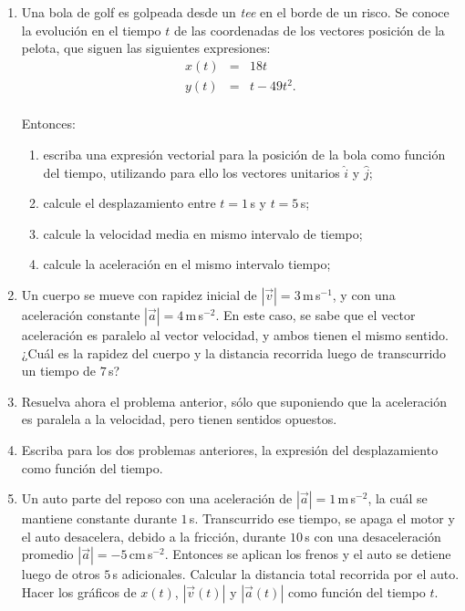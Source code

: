 \documentclass[a4paper,12pt]{article}
\begin{document}
\begin{enumerate}
\item Una bola de golf es golpeada desde un \textit{tee} en el borde de un risco. Se conoce la evolución en el tiempo $t$ de las coordenadas de los vectores posición de la pelota, que siguen las siguientes expresiones:
  \begin{eqnarray}
    x(t) &=& 18t \nonumber \\
    y(t) &=& t - 49t^{2}. \nonumber\\
  \end{eqnarray}

Entonces:

  \begin{enumerate}
    \item escriba una expresión vectorial para la posición de la bola como función del tiempo, utilizando para ello los vectores unitarios $\hat{i}$ y $\hat{j}$;
    \item calcule el desplazamiento entre $t=1$\,s y $t=5$\,s;
    \item calcule la velocidad media en mismo intervalo de tiempo; 
    \item calcule la aceleración en el mismo intervalo tiempo;
  \end{enumerate}

\item Un cuerpo se mueve con rapidez inicial de $|\vec v|=3$\,m\,s$^{-1}$, y con una aceleración constante $|\vec a|=4$\,m\,s$^{-2}$. En este caso, se sabe que el vector aceleración es paralelo al vector velocidad, y ambos tienen el mismo sentido. ¿Cuál es la rapidez del cuerpo y la distancia recorrida luego de transcurrido un tiempo de $7$\,s? 
\item Resuelva ahora el problema anterior, sólo que suponiendo que la aceleración es paralela a la velocidad, pero tienen sentidos opuestos.
\item Escriba para los dos problemas anteriores, la expresión del desplazamiento como función del tiempo.

\item Un auto parte del reposo con una aceleración de $|\vec a|=1$\,m\,s$^{-2}$, la cuál se mantiene constante durante $1$\,s. Transcurrido ese tiempo, se apaga el motor y el auto desacelera, debido a la fricción, durante $10$\,s con una desaceleración promedio $|\vec a|=-5$\,cm\,s$^{-2}$. Entonces se aplican los frenos y el auto se detiene luego de otros $5$\,s adicionales. Calcular la distancia total recorrida por el auto. Hacer los gráficos de $x(t)$, $|\vec v(t)|$ y $|\vec a(t)|$ como función del tiempo $t$.
\end{enumerate}
\end{document}
